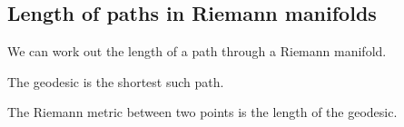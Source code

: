 
\subsection{Length of paths in Riemann manifolds}

We can work out the length of a path through a Riemann manifold.

The geodesic is the shortest such path.

The Riemann metric between two points is the length of the geodesic.


